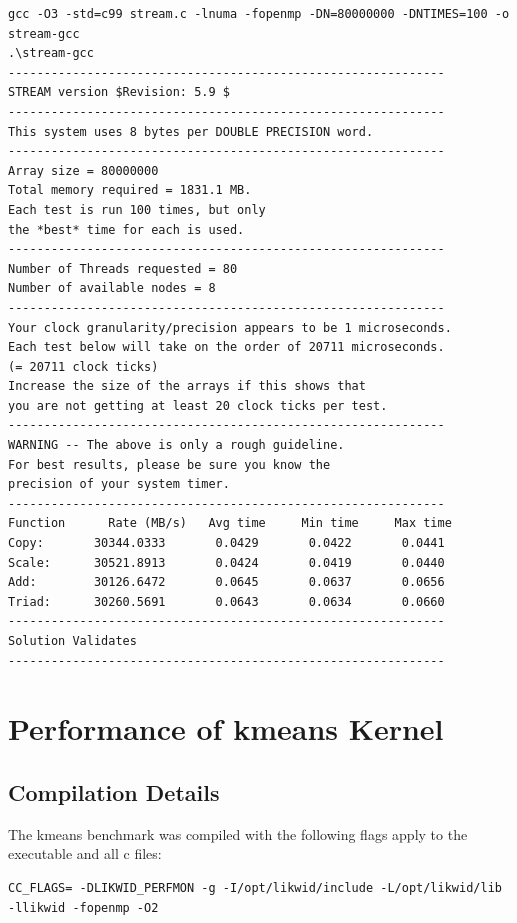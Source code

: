 \begin{center}
\begin{lstlisting}[basicstyle=\tiny]
gcc -O3 -std=c99 stream.c -lnuma -fopenmp -DN=80000000 -DNTIMES=100 -o stream-gcc
.\stream-gcc
-------------------------------------------------------------
STREAM version $Revision: 5.9 $
-------------------------------------------------------------
This system uses 8 bytes per DOUBLE PRECISION word.
-------------------------------------------------------------
Array size = 80000000
Total memory required = 1831.1 MB.
Each test is run 100 times, but only
the *best* time for each is used.
-------------------------------------------------------------
Number of Threads requested = 80
Number of available nodes = 8
-------------------------------------------------------------
Your clock granularity/precision appears to be 1 microseconds.
Each test below will take on the order of 20711 microseconds.
(= 20711 clock ticks)
Increase the size of the arrays if this shows that
you are not getting at least 20 clock ticks per test.
-------------------------------------------------------------
WARNING -- The above is only a rough guideline.
For best results, please be sure you know the
precision of your system timer.
-------------------------------------------------------------
Function      Rate (MB/s)   Avg time     Min time     Max time
Copy:       30344.0333       0.0429       0.0422       0.0441
Scale:      30521.8913       0.0424       0.0419       0.0440
Add:        30126.6472       0.0645       0.0637       0.0656
Triad:      30260.5691       0.0643       0.0634       0.0660
-------------------------------------------------------------
Solution Validates
-------------------------------------------------------------
\end{lstlisting}
\end{center}

\section{Performance of kmeans Kernel}

\subsection{Compilation Details}

The kmeans benchmark was compiled with the following flags apply to the executable and all c files:

\begin{verbatim}
CC_FLAGS= -DLIKWID_PERFMON -g -I/opt/likwid/include -L/opt/likwid/lib -llikwid -fopenmp -O2 
\end{verbatim}

